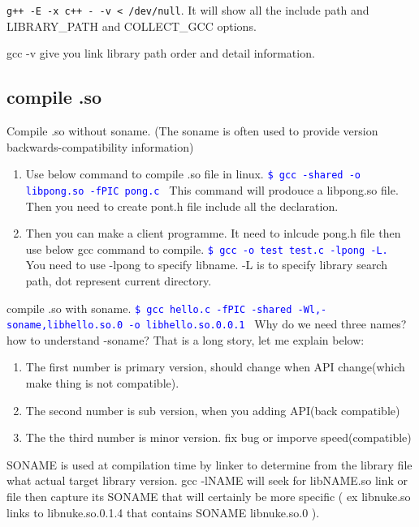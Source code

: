 \documentclass[paper=8.5in:11in, twoside, 12pt, pagesize=pdftex]{book}
\newcommand{\linuxcommand}[1]{\texttt{\textcolor{blue}{\$ #1 \Pisymbol{psy}{191}}}}
\begin{document}
	\verb=g++ -E -x c++ - -v < /dev/null=. It will show all the include path and LIBRARY\_PATH and COLLECT\_GCC options.

	gcc -v give you link library path order and detail information. 

\subsection{compile .so}
  Compile .so without soname. (The soname is often used to provide version backwards-compatibility information)

	\begin{enumerate}
	\item Use below command to compile .so file in linux. 
   \linuxcommand{gcc -shared -o libpong.so -fPIC pong.c} 
   This command will prodouce a libpong.so file. Then you need to create pont.h file include all the declaration. 
   
   \item Then you can make a client programme. It need to inlcude pong.h file then use below gcc command to compile. 
	\linuxcommand{gcc -o test test.c -lpong -L.}
	You need to use -lpong to specify libname. -L is to specify library search path, dot represent current directory.        
	\end{enumerate}

    compile .so with soname. \linuxcommand{gcc hello.c -fPIC -shared -Wl,-soname,libhello.so.0 -o libhello.so.0.0.1} Why do we need three names? how to understand -soname? That is a long story, let me explain below:
\begin{enumerate}
	\item The first number is primary version, should change when API change(which make thing is not compatible).
	
	\item The second number is sub version, when you adding API(back compatible)
	
	\item The the third number is minor version. fix bug or imporve speed(compatible)
\end{enumerate}				
		 
SONAME is used at compilation time by linker to determine from the library file what actual target library version. gcc -lNAME will seek for libNAME.so link or file then capture its SONAME that will certainly be more specific ( ex libnuke.so links to libnuke.so.0.1.4 that contains SONAME libnuke.so.0 ).
\end{document}
